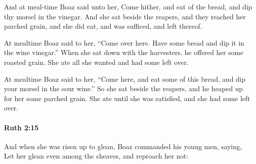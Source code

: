 			\begin{versebox}
					\item[BHS] 
					\item[LXX] 
					\item[ASV] And at meal-time Boaz said unto her, Come hither, and eat of the bread, and dip thy morsel in the vinegar. And she sat beside the reapers, and they reached her parched grain, and she did eat, and was sufficed, and left thereof.
					\item[NIV] At mealtime Boaz said to her, “Come over here. Have some bread and dip it in the wine vinegar.” When she sat down with the harvesters, he offered her some roasted grain. She ate all she wanted and had some left over.
					\item[NRSV] At mealtime Boaz said to her, “Come here, and eat some of this bread, and dip your morsel in the sour wine.” So she sat beside the reapers, and he heaped up for her some parched grain. She ate until she was satisfied, and she had some left over.
			\end{versebox}

		\paragraph{Ruth 2:15} %
			\label{RUTH-2-15}

			And when she was risen up to glean, Boaz commanded his young men, saying, Let her glean even among the sheaves, and reproach her not:

